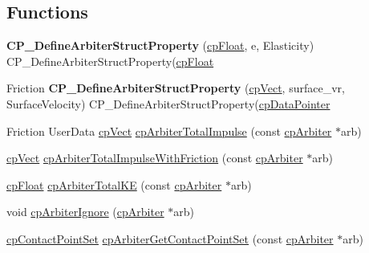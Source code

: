 \subsection*{Functions}
\begin{DoxyCompactItemize}
\item 
\hypertarget{group__cp_arbiter_gaaa2d7574d16e395d626e6da5e31fe938}{{\bfseries C\-P\-\_\-\-Define\-Arbiter\-Struct\-Property} (\hyperlink{group__basic_types_gac1ed65573e035bf892505768c852d8d3}{cp\-Float}, e, Elasticity) C\-P\-\_\-\-Define\-Arbiter\-Struct\-Property(\hyperlink{group__basic_types_gac1ed65573e035bf892505768c852d8d3}{cp\-Float}}\label{group__cp_arbiter_gaaa2d7574d16e395d626e6da5e31fe938}

\item 
\hypertarget{group__cp_arbiter_ga08229e50d46728f07b61d30b6d68c483}{Friction {\bfseries C\-P\-\_\-\-Define\-Arbiter\-Struct\-Property} (\hyperlink{structcp_vect}{cp\-Vect}, surface\-\_\-vr, Surface\-Velocity) C\-P\-\_\-\-Define\-Arbiter\-Struct\-Property(\hyperlink{group__basic_types_ga2ac2c3c31e21893941f9e4f8ee279447}{cp\-Data\-Pointer}}\label{group__cp_arbiter_ga08229e50d46728f07b61d30b6d68c483}

\item 
Friction User\-Data \hyperlink{structcp_vect}{cp\-Vect} \hyperlink{group__cp_arbiter_gab0ec5114217643d1af7a70ff62204e78}{cp\-Arbiter\-Total\-Impulse} (const \hyperlink{structcp_arbiter}{cp\-Arbiter} $\ast$arb)
\item 
\hyperlink{structcp_vect}{cp\-Vect} \hyperlink{group__cp_arbiter_gaecdf927c0c1e3b33e28522df66815d4e}{cp\-Arbiter\-Total\-Impulse\-With\-Friction} (const \hyperlink{structcp_arbiter}{cp\-Arbiter} $\ast$arb)
\item 
\hyperlink{group__basic_types_gac1ed65573e035bf892505768c852d8d3}{cp\-Float} \hyperlink{group__cp_arbiter_ga292d7e349093c0eba4f14c7ce46956fa}{cp\-Arbiter\-Total\-K\-E} (const \hyperlink{structcp_arbiter}{cp\-Arbiter} $\ast$arb)
\item 
void \hyperlink{group__cp_arbiter_ga6a77d95bd4871c3bea270ca40956bbcf}{cp\-Arbiter\-Ignore} (\hyperlink{structcp_arbiter}{cp\-Arbiter} $\ast$arb)
\item 
\hypertarget{group__cp_arbiter_gada18a6cf4d44ef1fea136f97f3351d66}{\hyperlink{structcp_contact_point_set}{cp\-Contact\-Point\-Set} \hyperlink{group__cp_arbiter_gada18a6cf4d44ef1fea136f97f3351d66}{cp\-Arbiter\-Get\-Contact\-Point\-Set} (const \hyperlink{structcp_arbiter}{cp\-Arbiter} $\ast$arb)}\label{group__cp_arbiter_gada18a6cf4d44ef1fea136f97f3351d66}


\end{DoxyCompactItemize}

